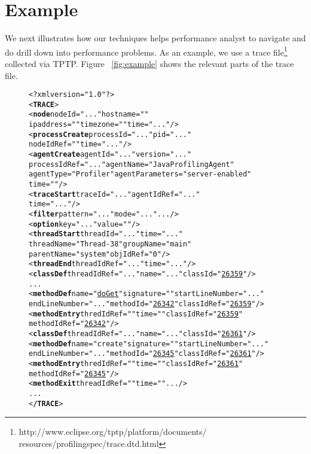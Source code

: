 \section{Example}
\label{sec:example}
%

We next illustrates how our techniques helps performance analyst to navigate and do drill down into performance problems. As an example, we use a trace file\footnote{http://www.eclipse.org/tptp/platform/documents/\\
resources/profilingspec/trace.dtd.html} collected via TPTP.
Figure ~\ref{fig:example} shows the relevant parts of the trace file.

\begin{figure}[t]
\begin{CodeOut}
\begin{alltt}
<?xml version="1.0"?>
<\textbf{TRACE}>
<\textbf{node} nodeId="..." hostname=""
 ipaddress="" timezone="" time="..."/>
<\textbf{processCreate} processId="..." pid="..."
 nodeIdRef="" time="..."/>
<\textbf{agentCreate} agentId="..." version="..."
 processIdRef="..." agentName="Java Profiling Agent"
 agentType="Profiler" agentParameters="server-enabled"
 time=""/>
<\textbf{traceStart} traceId="..." agentIdRef="..."
 time="..."/>
<\textbf{filter} pattern="..." mode="..." .../>
<\textbf{option} key="..." value=""/>
<\textbf{threadStart} threadId="..." time="..."
 threadName="Thread-38" groupName="main"
 parentName="system" objIdRef="0"/>
<\textbf{threadEnd} threadIdRef="..." time="..." />
<\textbf{classDef} threadIdRef="..." name="..." classId="\underline{26359}"/>
...
<\textbf{methodDef} name="\underline{doGet}" signature="" startLineNumber="..."
 endLineNumber="..." methodId="\underline{26342}" classIdRef="\underline{26359}"/>
<\textbf{methodEntry} thredIdRef="" time="" classIdRef="\underline{26359}"
 methodIdRef="\underline{26342}"/>
<\textbf{classDef} threadIdRef="..." name="..." classId="\underline{26361}"/>
<\textbf{methodDef} name="create" signature="" startLineNumber="..."
 endLineNumber="..." methodId="\underline{26345}" classIdRef="\underline{26361}"/>
<\textbf{methodEntry} thredIdRef="" time="" classIdRef="\underline{26361}"
 methodIdRef="\underline{26345}"/>
<\textbf{methodExit} threadIdRef="" time="".../>
...
<\textbf{/TRACE}>
\end{alltt}
\end{CodeOut}\vspace*{-2ex}
\vspace*{-3ex}
\end{figure}

